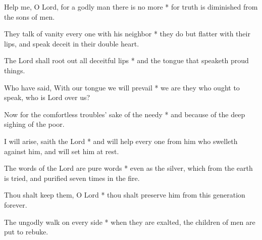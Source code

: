 Help me, O Lord, for a godly man there is no more * for truth is diminished from the sons of men.

They talk of vanity every one with his neighbor * they do but flatter with their lips, and speak deceit in their double heart.

The Lord shall root out all deceitful lips * and the tongue that speaketh proud things.

Who have said, With our tongue we will prevail * we are they who ought to speak, who is Lord over us?

Now for the comfortless troubles' sake of the needy * and because of the deep sighing of the poor.

I will arise, saith the Lord * and will help every one from him who swelleth against him, and will set him at rest.

The words of the Lord are pure words * even as the silver, which from the earth is tried, and purified seven times in the fire.

Thou shalt keep them, O Lord * thou shalt preserve him from this generation forever.

The ungodly walk on every side * when they are exalted, the children of men are put to rebuke.